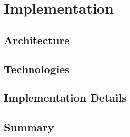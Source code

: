 \chapter{Implementation}

\section{Architecture}

\section{Technologies}

\section{Implementation Details}


\section{Summary}
